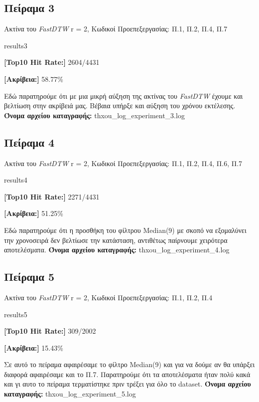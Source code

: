 \subsection{Πείραμα 3}
Ακτίνα του \textit{FastDTW} r = 2, Κωδικοί Προεπεξεργασίας: Π.1, Π.2, Π.4, Π.7
\begin{labeling}{results3}
  \item \textbf{[Top10 Hit Rate:]} 2604/4431
  \item \textbf{[Ακρίβεια:]} 58.77\%
\end{labeling}
Εδώ παρατηρούμε ότι με μια μικρή αύξηση της ακτίνας του \textit{FastDTW} έχουμε και βελτίωση στην ακρίβειά μας.
Βέβαια υπήρξε και αύξηση του χρόνου εκτέλεσης.
\textbf{Όνομα αρχείου καταγραφής:} thxou\_log\_experiment\_3.log

\subsection{Πείραμα 4}
Ακτίνα του \textit{FastDTW} r = 2, Κωδικοί Προεπεξεργασίας: Π.1, Π.2, Π.4, Π.6, Π.7
\begin{labeling}{results4}
  \item \textbf{[Top10 Hit Rate:]} 2271/4431
  \item \textbf{[Ακρίβεια:]} 51.25\%
\end{labeling}
Εδώ παρατηρούμε ότι η προσθήκη του φίλτρου Median(9) με σκοπό να εξομαλύνει την χρονοσειρά δεν βελτίωσε την κατάσταση, αντιθέτως παίρνουμε χειρότερα αποτελέσματα.
\textbf{Όνομα αρχείου καταγραφής:} thxou\_log\_experiment\_4.log

\subsection{Πείραμα 5}
Ακτίνα του \textit{FastDTW} r = 2, Κωδικοί Προεπεξεργασίας: Π.1, Π.2, Π.4
\begin{labeling}{results5}
  \item \textbf{[Top10 Hit Rate:]} 309/2002
  \item \textbf{[Ακρίβεια:]} 15.43\%
\end{labeling}
Σε αυτό το πείραμα αφαιρέσαμε το φίλτρο Median(9) και για να δούμε αν θα υπάρξει διαφορά αφαιρέσαμε και το Π.7. Παρατηρούμε ότι τα αποτελέσματα ήταν πολύ κακά και γι αυτο το πείραμα τερματίστηκε πριν τρέξει για όλο το dataset.
\textbf{Όνομα αρχείου καταγραφής:} thxou\_log\_experiment\_5.log

